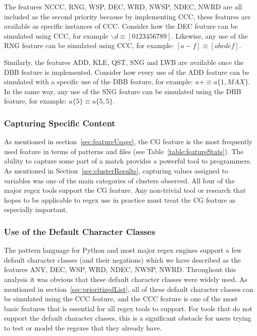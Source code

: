 The features NCCC, RNG, WSP, DEC, WRD, NWSP, NDEC, NWRD are all included as the second priority because by implementing CCC, these features are available as specific instances of CCC.  Consider how the DEC feature can be simulated using CCC, for example  $\backslash d \equiv [0123456789]$. Likewise, any use of the RNG feature can be simulated using CCC, for example: $[a-f] \equiv [abcdef]$.

Similarly, the features ADD, KLE, QST, SNG and LWB are available once the DBB feature is implemented.  Consider how every use of the ADD feature can be simulated with a specific use of the DBB feature, for example: $a+ \equiv a\{1, MAX\}$.  In the same way, any use of the SNG feature can be simulated using the DBB feature, for example:  $a\{5\} \equiv a\{5, 5\}$.


\subsubsection{Capturing Specific Content}
As mentioned in section~\ref{sec:featureUsage}, the CG feature is the most frequently used feature in terms of patterns and files (see Table~\ref{table:featureStats}).  The ability to capture some part of a match provides a powerful tool to programmers.  As mentioned in Section~\ref{sec:clusterResults}, capturing values assigned to variables was one of the main categories of clusters observed.  All four of the major regex tools support the CG feature.  Any non-trivial tool or research that hopes to be applicable to regex use in practice must treat the CG feature as especially important.

\subsubsection{Use of the Default Character Classes}
The pattern language for Python and most major regex engines support a few default character classes (and their negations) which we have described as the features ANY, DEC, WSP, WRD, NDEC, NWSP, NWRD.  Throughout this analysis it was obvious that these default character classes were widely used.  As mentioned in section~\ref{sec:prioritizedList}, all of these default character classes can be simulated using the CCC feature, and the CCC feature is one of the most basic features that is essential for all regex tools to support.  For tools that do not support the default character classes, this is a significant obstacle for users trying to test or model the regexes that they already have.


